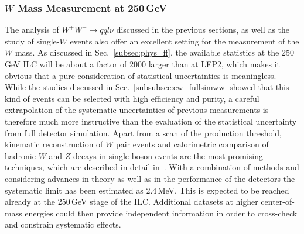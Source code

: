 \subsubsection{$W$ Mass Measurement at 250\,GeV}
\label{subsubsec:ew_mw}
The analysis of $W^+W^- \to qql\nu$ discussed in the previous sections, as well as the study of single-$W$ events also offer an excellent setting for the measurement of the $W$ mass. As discussed in Sec.~\ref{subsec:phys_ff}, the available statistics at the 250\,GeV ILC will be about a factor of 2000 larger than at LEP2, which makes it obvious that a pure consideration of statistical uncertainties is meaningless. While the studies discussed in Sec.~\ref{subsubsec:ew_fullsimww} showed that this kind of events can be selected with high efficiency and purity, a careful extrapolation of the systematic uncertainties of previous measurements is therefore much more instructive than the evaluation of the statistical uncertainty from full detector simulation.
Apart from a scan of the production threshold, kinematic reconstruction of $W$ pair events 
and calorimetric comparison of hadronic $W$ and  $Z$ decays in single-boson events are the most promising techniques, which are described in detail in~\cite{Freitas:2013xga, Wilson:2016tto}.   With a combination of methods and considering advances in theory as well as in the performance of the detectors the systematic limit has been estimated as 2.4\,MeV. This is expected to be reached already at the 250\,GeV stage of the ILC. Additional datasets at higher center-of-mass energies 
could then provide independent information in order to cross-check and constrain systematic effects.
